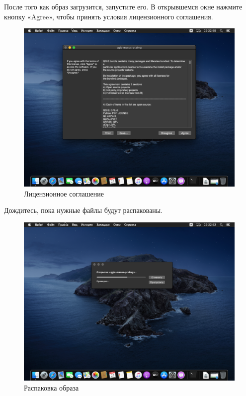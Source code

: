 \documentclass[
  12pt,
]{book}
\begin{document}
После того как образ загрузится, запустите его. В открывшемся окне нажмите кнопку «Agree», чтобы принять условия лицензионного соглашения.

\begin{figure}
\centering
\includegraphics{images/installation_instruction_mac/mac02.png}
\caption{Лицензионное соглашение}
\end{figure}

Дождитесь, пока нужные файлы будут распакованы.

\begin{figure}
\centering
\includegraphics{images/installation_instruction_mac/mac03.png}
\caption{Распаковка образа}
\end{figure}
\end{document}
